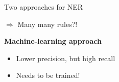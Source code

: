 \documentclass[xcolor=x11names, aspectratio=169,usenames,dvipsnames]{beamer}
\begin{document}
\begin{frame}{Two approaches for NER}
\begin{minipage}[t]{0.45\textwidth}
\begin{itemize}
$\Rightarrow$ \alert{Many many rules?!}
\end{itemize}
\end{minipage}\pause\pause\hfill
\begin{minipage}[t]{0.45\textwidth}
\textbf{Machine-learning approach}
\begin{itemize}
\item Lower precision, but high recall
\item \alert{Needs to be trained!}
\end{itemize}\vspace*{-1em}
\end{minipage}
\end{frame}
\end{document}
